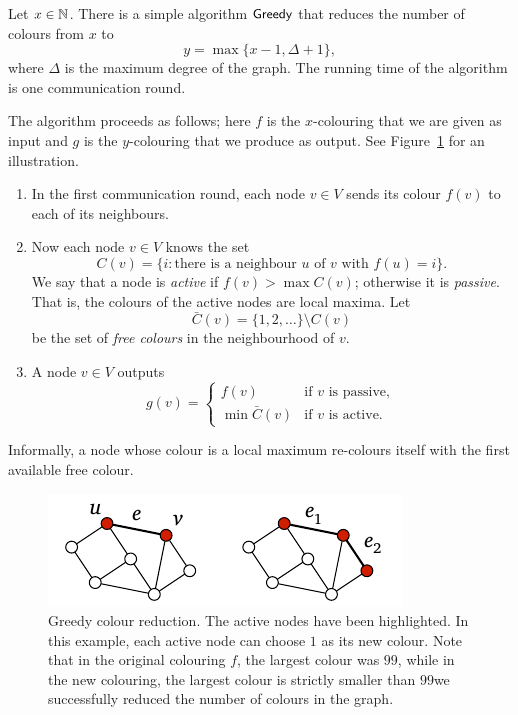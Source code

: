 Let $x \in \mathbb{N}$. There is a simple algorithm $\textsf{Greedy}$ that reduces the number of colours from $x$ to
\[
    y = \max \{ x-1, \Delta+1 \},
\]
where $\Delta$ is the maximum degree of the graph. The running time of the algorithm is one communication round.

The algorithm proceeds as follows; here $f$ is the $x$-colouring that we are given as input and $g$ is the $y$-colouring that we produce as output. See Figure~\ref{fig:greedy} for an illustration.
\begin{enumerate}
    \item In the first communication round, each node $v \in V$ sends its colour $f(v)$ to each of its neighbours.
    \item Now each node $v \in V$ knows the set
    \[
        C(v) = \{ i : \text{there is a neighbour $u$ of $v$ with $f(u) = i$} \}.
    \]
    We say that a node is \emph{active} if $f(v) > \max C(v)$; otherwise it is \emph{passive}. That is, the colours of the active nodes are local maxima. Let
    \[
        \bar{C}(v) = \{1,2,\dotsc\} \setminus C(v)
    \]
    be the set of \emph{free colours} in the neighbourhood of $v$.
    \item A node $v \in V$ outputs
    \[
        g(v) = \begin{cases}
            f(v) & \text{if $v$ is passive}, \\
            \min \bar{C}(v) & \text{if $v$ is active}.
        \end{cases}
    \]
\end{enumerate}
Informally, a node whose colour is a local maximum re-colours itself with the first available free colour.

\begin{figure}
    \centering
    \includegraphics[page=\PGreedy]{figs.pdf}
    \caption{Greedy colour reduction. The active nodes have been highlighted. In this example, each active node can choose $1$ as its new colour. Note that in the original colouring $f$, the largest colour was $99$, while in the new colouring, the largest colour is strictly smaller than $99$\mydash we successfully reduced the number of colours in the graph.}\label{fig:greedy}
\end{figure}

